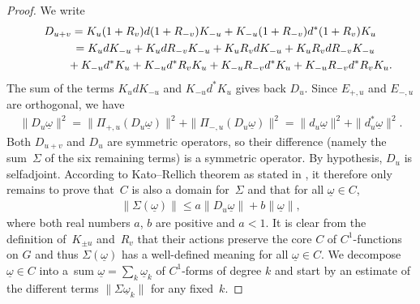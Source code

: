 \documentclass[11pt]{article}
\newcommand{\Core}{C}
\newcommand{\omegat}{\underline{\omega}}
\numberwithin{equation}{section}
\begin{document}
\begin{proof}
We write
\begin{gather*}
D_{u+v} = K_{u} (1 + R_v) d (1+ R_{-v}) K_{-u} + K_{-u} (1+R_{-v}) d^* (1+R_v) K_{u} \\
\hphantom{D_{u+v}}{}
= K_u d K_{-u} + K_u d R_{-v} K_{-u} + K_u R_v d K_{-u} + K_u R_v d R_{-v} K_{-u} \\
\hphantom{D_{u+v}=}{}
+ K_{-u} d^* K_{u} + K_{-u} d^* R_v K_u + K_{-u} R_{-v} d^* K_u + K_{-u} R_{-v} d^* R_v K_u.
\end{gather*}
The sum of the terms $K_u d K_{-u}$ and $K_{-u} d^* K_{u}$ gives back $D_u$. Since $E_{+, u}$ and $E_{-,u}$ are orthogonal, we have
\begin{gather}
\label{Eqn:Pyth}
\| D_u \omegat \|^2 = \| \Pi_{+, u}( D_u \omegat ) \|^2 + \| \Pi_{-, u}( D_u \omegat ) \|^2 = \| d_{u} \omegat \|^2 + \| d_u^* \omegat \|^2.
\end{gather}
Both $D_{u+v}$ and $D_u$ are symmetric operators, so their dif\/ference (namely the sum~$\Sigma$ of the six remaining terms) is a symmetric operator. By hypothesis, $D_u$ is selfadjoint. According to Kato--Rellich theorem as stated in \cite[Theorem~X.12, p.~162]{ReedSimon2}, it therefore only remains to prove that~$\Core$ is also a domain for~$\Sigma$ and that for all $\omegat \in \Core$,
\begin{gather*}
\| \Sigma(\omegat) \| \leqslant a \| D_u \omegat \| + b \| \omegat \|,
\end{gather*}
where both real numbers $a$, $b$ are positive and $a < 1 $. It is clear from the def\/inition of~$K_{\pm u}$ and~$R_v$ that their actions preserve the core $\Core$ of $C^1$-functions on $G$ and thus $\Sigma(\omegat)$ has a well-def\/ined meaning for all $\omegat \in \Core$. We decompose $\omegat \in \Core$ into a~sum $\omegat = \sum_{k} \omegat_k$ of $C^1$-forms of degree $k$ and start by an estimate of the dif\/ferent terms $\| \Sigma \omegat_k \|$ for any f\/ixed~$k$.


\end{proof}
\end{document}
